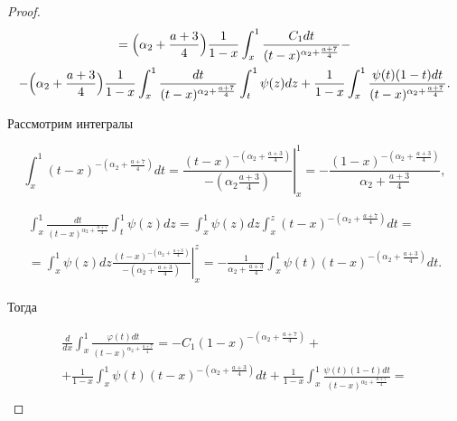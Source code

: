 \begin{proof}
\begin{multline*}
=\Bigl(\alpha_2+\frac{a+3}{4}\Bigr)\frac{1}{1-x}\int_{x}^{1}\frac{C_1dt}{(t-x)^{\alpha_2+\frac{a+7}{4}}}-

\\

-\Bigl(\alpha_2+\frac{a+3}{4}\Bigr)\frac{1}{1-x}\int_{x}^{1}\frac{dt}{(t-x)^{\alpha_2+\frac{a+7}{4}}}\int_{t}^{1}\psi(z)dz

+\frac{1}{1-x}\int_{x}^{1}\frac{\psi(t)(1-t)dt}{(t-x)^{\alpha_2+\frac{a+7}{4}}}.

\end{multline*}



Рассмотрим интегралы

$$\int_{x}^{1}(t-x)^{-\left(\alpha_2+\frac{a+7}{4}\right)}dt=\left.\frac{(t-x)^{-\left(\alpha_2+\frac{a+3}{4}\right)}}{-\left(\alpha_2\frac{a+3}{4}\right)}\right|_{x}^{1}=-\frac{(1-x)^{-\left(\alpha_2+\frac{a+3}{4}\right)}}{\alpha_2+\frac{a+3}{4}},$$

\begin{multline*}

\int_{x}^{1}\frac{dt}{(t-x)^{\alpha_2+\frac{a+7}{4}}}\int_{t}^{1}\psi(z)dz

=\int_{x}^{1}\psi(z)dz\int_{x}^{z}(t-x)^{-\left(\alpha_2+\frac{a+7}{4}\right)}dt=

\\

=\int_{x}^{1}\psi(z)dz\left.\frac{(t-x)^{-\left(\alpha_2+\frac{a+3}{4}\right)}}{-\left(\alpha_2+\frac{a+3}{4}\right)}\right|_{x}^{z}

=-\frac{1}{\alpha_2+\frac{a+3}{4}}\int_{x}^{1}\psi(t)(t-x)^{-\left(\alpha_2+\frac{a+3}{4}\right)}dt.

\end{multline*}

Тогда

\begin{multline*}

\frac{d}{dx}\int_{x}^{1}\frac{\varphi(t)dt}{(t-x)^{\alpha_2+\frac{a+7}{4}}}

=-C_1(1-x)^{-\left(\alpha_2+\frac{a+7}{4}\right)}+

\\

+\frac{1}{1-x}\int_{x}^{1}\psi(t)(t-x)^{-\left(\alpha_2+\frac{a+3}{4}\right)}dt+

\frac{1}{1-x}\int_{x}^{1}\frac{\psi(t)(1-t)dt}{(t-x)^{\alpha_2+\frac{a+7}{4}}}=

\\


\end{multline*}
\end{proof}
